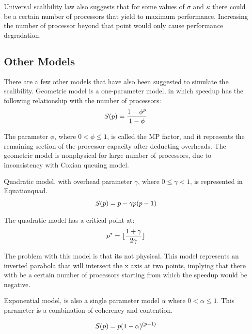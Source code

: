 Universal scalibility law also suggests that for some values of $\sigma$ and $\kappa$ there could be a certain number of processors that yield to maximum performance\cite{gunther2007guerrilla}. Increasing the number of processor beyond that point would only cause performance degradation.  

\vspace{\baselineskip}
\subsection{Other Models}	
There are a few other models that have also been suggested to simulate the scalibility. Geometric model is a one-parameter model, in which speedup has the following relationship with the number of processors:
\begin{equation}\label{geo}
S(p) = \frac{1-\phi^{p}}{1-\phi}\\
\end{equation}

The parameter $\phi$, where $0<\phi\leqslant1$, is called the MP factor, and it represents the remaining section of the processor capacity after deducting overheads. 
The geometric model is nonphysical for large number of processors, due to inconsistency with Coxian queuing model\cite{gunther2002new}. 

Quadratic model\cite{gunther2000practical}, with overhead parameter $\gamma$, where $0	\leqslant\gamma<1$, is represented in Equation{quad}.
\begin{equation}\label{quad}
S(p) = p-\gamma{p(p-1)}\\
\end{equation}

The quadratic model has a critical point at: 
\begin{equation}\label{quad_critical}
p^* = \lfloor\frac{1+\gamma}{2\gamma}\rfloor \\
\end{equation}

The problem with this model is that its not physical. This model represents an inverted parabola that will intersect the x axis at two points, implying that there with be a certain number of processors starting from which the speedup would be negative. 


Exponential model, is also a single parameter model $\alpha$ where $0<\alpha\leqslant1$. This parameter is a combination of coherency and contention. 

\begin{equation}\label{expo}
S(p) = p(1-\alpha)^{(p-1)}\\
\end{equation}

